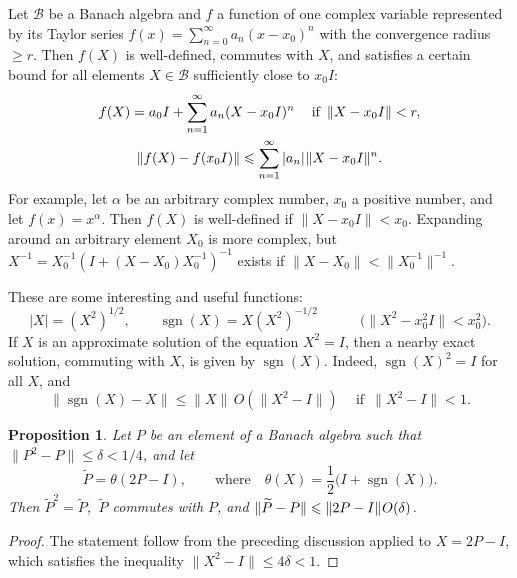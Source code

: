 \documentclass[12pt]{article}
\newcommand{\calB}{\mathcal{B}}
\newcommand{\ts}{\mkern1mu}
\DeclareMathOperator{\sgn}{sgn}
\newcommand{\wt}{\widetilde}
\renewcommand{\le}{\leqslant}
\renewcommand{\ge}{\geqslant}
\newtheorem{Proposition}[Theorem]{Proposition}
\newtheorem[definition]{Definition}[Theorem]{Definition}
\newtheorem[remark]{Example}[Theorem]{Example}
\newtheorem[remark]{Remark}[Theorem]{Remark}
\newtheorem[remark]{Question}[Theorem]{Open question}
\newtheorem*[definition]{definition}{Definition}
\newtheorem*[remark]{example}{Example}
\newtheorem*[remark]{remark}{Remark}
\newtheorem*[remark]{question}{Open question}
\numberwithin{equation}{section}
\begin{document}
Let $\calB$ be a Banach algebra and $f$ a function of one complex variable represented by its Taylor series $f(x)=\sum_{n=0}^{\infty}a_n(x-x_0)^n$ with the convergence radius $\ge r$. Then $f(X)$ is well-defined, commutes with $X$, and satisfies a certain bound for all elements $X\in\calB$ sufficiently close to $x_0I$:
\begin{gather}
\label{Taylor_simple}
f(X)=a_0I+\sum_{n=1}^{\infty}a_n(X-x_0I)^n\quad\:
\text{if }\, \|X-x_0I\|<r,\\
\label{Taylor_simple_bound}
\|f(X)-f(x_0I)\|\le \sum_{n=1}^{\infty}|a_n|\ts\|X-x_0I\|^n.
\end{gather}
For example, let $\alpha$ be an arbitrary complex number, $x_0$ a positive number, and let $f(x)=x^{\alpha}$. Then $f(X)$ is well-defined if $\|X-x_0I\|<x_0$. Expanding around an arbitrary element $X_0$ is more complex, but $X^{-1}=X_0^{-1}(I+(X-X_0)X_0^{-1})^{-1}$ exists if $\|X-X_0\|<\|X_0^{-1}\|^{-1}$.

These are some interesting and useful functions:
\begin{equation}\label{abs_sgn}
|X|=(X^2)^{1/2},\qquad \sgn(X)=X(X^2)^{-1/2}\qquad\quad
\bigl(\|X^2-x_0^2I\|<x_0^2\bigr).
\end{equation}
If $X$ is an approximate solution of the equation $X^2=I$, then a nearby exact solution, commuting with $X$, is given by $\sgn(X)$. Indeed, $\sgn(X)^2=I$ for all $X$, and
\begin{equation}
\|\sgn(X)-X\|\le \|X\|\,O(\|X^2-I\|)\quad\:
\text{if }\, \|X^2-I\|<1.
\end{equation}

\begin{Proposition}\label{prop_P}
Let $P$ be an element of a Banach algebra such that $\|P^2-P\|\le\delta<1/4$, and let
\begin{equation}
\wt{P}=\theta(2P-I),\qquad
\text{where}\quad \theta(X)=\frac{1}{2}\bigl(I+\sgn(X)\bigr).
\end{equation}
Then $\wt{P}^2=\wt{P}$,\, $\wt{P}$ commutes with $P$, and $\|\wt{P}-P\|\le \|2P-I\|\ts O(\delta)$.
\end{Proposition}
\begin{proof} The statement follow from the preceding discussion applied to $X=2P-I$, which satisfies the inequality $\|X^2-I\|\le 4\delta<1$.
\end{proof}
\end{document}
